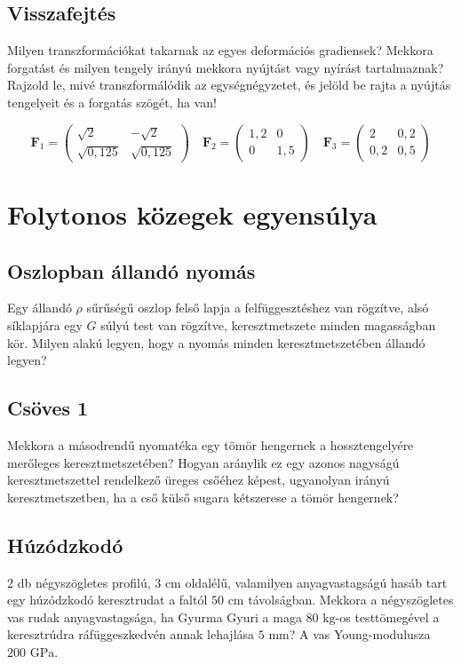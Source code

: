 \documentclass[12pt,a4paper]{scrartcl}
\let\mathbf\bm
\begin{document}
\subsection{Visszafejtés}
Milyen transzformációkat takarnak az egyes deformációs gradiensek? Mekkora forgatást és milyen tengely irányú mekkora nyújtást vagy nyírást tartalmaznak? Rajzold le, mivé transzformálódik az egységnégyzetet, és jelöld be rajta a nyújtás tengelyeit és a forgatás szögét, ha van!

\[{{\mathbf{F}}_1} = \left( {\begin{array}{*{20}{c}}
  {\sqrt 2 }&-{\sqrt 2 } \\ 
  {\sqrt {0{,}125} }&{ \sqrt {0{,}125} } 
\end{array}} \right)\quad {{\mathbf{F}}_2} = \left( {\begin{array}{*{20}{c}}
  {1{,}2}&0 \\ 
  0&{1{,}5} 
\end{array}} \right)\quad {{\mathbf{F}}_3} = \left( {\begin{array}{*{20}{c}}
  2&{0{,}2} \\ 
  {0{,}2}&{0{,}5} 
\end{array}} \right)\]


\section{Folytonos közegek egyensúlya}

\subsection{Oszlopban állandó nyomás}
Egy állandó $\rho$ sűrűségű oszlop felső lapja a felfüggesztéshez van rögzítve, alsó síklapjára egy $G$ súlyú test van rögzítve, keresztmetszete minden magasságban kör. Milyen alakú legyen, hogy a nyomás minden keresztmetszetében állandó legyen?

\subsection{Csöves 1}
Mekkora a másodrendű nyomatéka egy tömör hengernek a hossztengelyére merőleges keresztmetszetében? Hogyan aránylik ez egy azonos nagyságú keresztmetszettel rendelkező üreges csőéhez képest, ugyanolyan irányú keresztmetszetben, ha a cső külső sugara kétszerese a tömör hengernek?

\subsection{Húzódzkodó}
2 db négyszögletes profilú, $3\text{ cm}$ oldalélű, valamilyen anyagvastagságú hasáb tart egy húzódzkodó keresztrudat a faltól $50\text{ cm}$ távolságban. Mekkora a négyszögletes vas rudak anyagvastagsága, ha Gyurma Gyuri a maga $80\text{ kg}$-os testtömegével a keresztrúdra ráfüggeszkedvén annak lehajlása $5\text{ mm}$? A vas Young-modulusza $200\text{ GPa}$.
\end{document}
